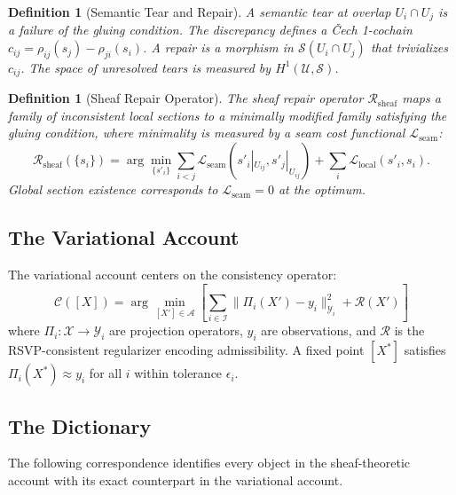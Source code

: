 \documentclass[11pt, oneside]{article}
\newtheorem{definition}[theorem]{Definition}
\begin{document}
\begin{definition}[Semantic Tear and Repair]
A \emph{semantic tear} at overlap $U_i \cap U_j$ is a failure of the gluing condition.
The discrepancy defines a \v{C}ech 1-cochain
$c_{ij} = \rho_{ij}(s_j) - \rho_{ji}(s_i)$. A \emph{repair} is a morphism in
$\mathcal{S}(U_i \cap U_j)$ that trivializes $c_{ij}$. The space of unresolved tears is
measured by $H^1(\mathcal{U}, \mathcal{S})$.
\end{definition}

\begin{definition}[Sheaf Repair Operator]
The \emph{sheaf repair operator} $\mathcal{R}_{\mathrm{sheaf}}$ maps a family of
inconsistent local sections to a minimally modified family satisfying the gluing condition,
where minimality is measured by a seam cost functional $\mathcal{L}_{\mathrm{seam}}$:
\[
\mathcal{R}_{\mathrm{sheaf}}(\{s_i\}) = \arg\min_{\{s'_i\}} \sum_{i < j}
\mathcal{L}_{\mathrm{seam}}(s'_i|_{U_{ij}}, s'_j|_{U_{ij}}) +
\sum_i \mathcal{L}_{\mathrm{local}}(s'_i, s_i).
\]
Global section existence corresponds to $\mathcal{L}_{\mathrm{seam}} = 0$ at the optimum.
\end{definition}

\subsection{The Variational Account}

The variational account centers on the consistency operator:
\[
\mathcal{C}([X]) = \arg\min_{[X'] \in \mathcal{A}}
\left[ \sum_{i \in \mathcal{I}} \|\Pi_i(X') - y_i\|_{\mathcal{Y}_i}^2
+ \mathcal{R}(X') \right]
\]
where $\Pi_i : \mathcal{X} \to \mathcal{Y}_i$ are projection operators, $y_i$ are
observations, and $\mathcal{R}$ is the RSVP-consistent regularizer encoding admissibility.
A fixed point $[X^*]$ satisfies $\Pi_i(X^*) \approx y_i$ for all $i$ within tolerance
$\epsilon_i$.

\subsection{The Dictionary}

The following correspondence identifies every object in the sheaf-theoretic account with
its exact counterpart in the variational account.
\end{document}
